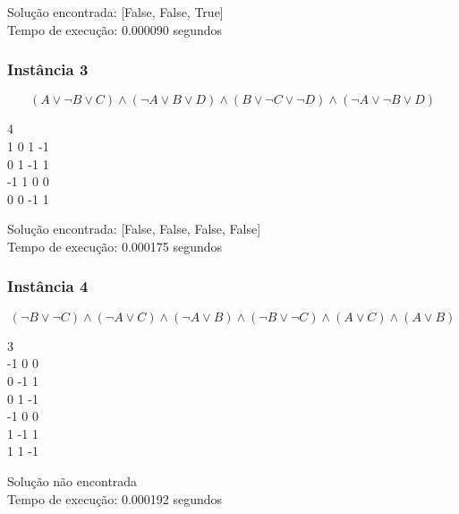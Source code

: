 \documentclass[12pt]{article}
\begin{document}
        \begin{tcolorbox}[title=Saída da instância 2, width=\linewidth, fontupper=\ttfamily, halign=flush left]
            Solução encontrada: [False, False, True] \\
            Tempo de execução: 0.000090 segundos   \\
        \end{tcolorbox}

    \subsubsection{Instância 3}
        \[(A \lor \neg B \lor C) \land (\neg A \lor B \lor D) \land (B \lor \neg C \lor \neg D) \land (\neg A \lor \neg B \lor D)\]
        \begin{tcolorbox}[title=Entrada da instância 3, width=\linewidth, fontupper=\ttfamily,  halign=flush left]
            4 \\
            1 0 1 -1 \\
            0 1 -1 1 \\
            -1 1 0 0 \\
            0 0 -1 1 \\

        \end{tcolorbox}
        \begin{tcolorbox}[title=Saída da instância 3, width=\linewidth, fontupper=\ttfamily, halign=flush left]
            Solução encontrada: [False, False, False, False] \\
            Tempo de execução: 0.000175 segundos
        \end{tcolorbox}

    \subsubsection{Instância 4}
    
        \[(\neg B \lor \neg C) \land (\neg A \lor C) \land (\neg A \lor B) \land (\neg B \lor \neg C) \land (A \lor C) \land (A \lor B)\]
        \begin{tcolorbox}[title=Entrada da instância 4, width=\linewidth, fontupper=\ttfamily,  halign=flush left]
            3 \\
            -1 0 0 \\
            0 -1 1 \\
            0 1 -1 \\
            -1 0 0 \\
            1 -1 1 \\
            1 1 -1 \\
        \end{tcolorbox}
        \begin{tcolorbox}[title=Saída da instância 4, width=\linewidth, fontupper=\ttfamily, halign=flush left]
            Solução não encontrada \\
            Tempo de execução: 0.000192 segundos
        \end{tcolorbox}
\end{document}
